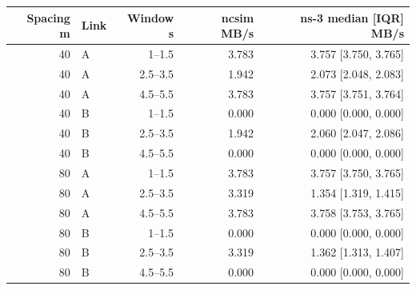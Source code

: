 \begin{tabular}{rlrrr}
\toprule
Spacing m & Link & Window s & ncsim MB/s & ns-3 median [IQR] MB/s \\
\midrule
40 & A & 1--1.5 & 3.783 & 3.757 [3.750, 3.765] \\
40 & A & 2.5--3.5 & 1.942 & 2.073 [2.048, 2.083] \\
40 & A & 4.5--5.5 & 3.783 & 3.757 [3.751, 3.764] \\
40 & B & 1--1.5 & 0.000 & 0.000 [0.000, 0.000] \\
40 & B & 2.5--3.5 & 1.942 & 2.060 [2.047, 2.086] \\
40 & B & 4.5--5.5 & 0.000 & 0.000 [0.000, 0.000] \\
80 & A & 1--1.5 & 3.783 & 3.757 [3.750, 3.765] \\
80 & A & 2.5--3.5 & 3.319 & 1.354 [1.319, 1.415] \\
80 & A & 4.5--5.5 & 3.783 & 3.758 [3.753, 3.765] \\
80 & B & 1--1.5 & 0.000 & 0.000 [0.000, 0.000] \\
80 & B & 2.5--3.5 & 3.319 & 1.362 [1.313, 1.407] \\
80 & B & 4.5--5.5 & 0.000 & 0.000 [0.000, 0.000] \\
\bottomrule
\end{tabular}
